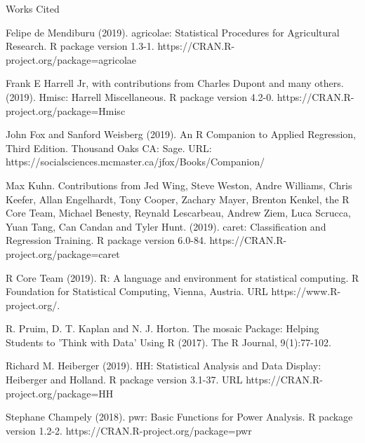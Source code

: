 \documentclass[letter,12pt]{article}
\begin{document}
	\begin{center}
		Works Cited
	\end{center}
	\raggedright
	\begin{hangparas}{.5in}{1}
		Felipe de Mendiburu (2019). agricolae: Statistical Procedures for Agricultural Research. R package version 1.3-1. https://CRAN.R-project.org/package=agricolae
	\end{hangparas}
	\begin{hangparas}{.5in}{1}
	  Frank E Harrell Jr, with contributions from Charles Dupont and many others. (2019). Hmisc: Harrell Miscellaneous. R package version 4.2-0. https://CRAN.R-project.org/package=Hmisc
	\end{hangparas}
	\begin{hangparas}{.5in}{1}
		John Fox and Sanford Weisberg (2019). An {R} Companion to Applied Regression, Third Edition. Thousand Oaks CA: Sage. URL: https://socialsciences.mcmaster.ca/jfox/Books/Companion/
	\end{hangparas}
	\begin{hangparas}{.5in}{1}
	  Max Kuhn. Contributions from Jed Wing, Steve Weston, Andre Williams, Chris Keefer, Allan Engelhardt, Tony Cooper, Zachary Mayer, Brenton Kenkel, the R Core Team, Michael Benesty, Reynald Lescarbeau, Andrew Ziem, Luca Scrucca, Yuan Tang, Can Candan and Tyler Hunt. (2019). caret: Classification and Regression Training. R package version 6.0-84. https://CRAN.R-project.org/package=caret
	\end{hangparas}
	\begin{hangparas}{.5in}{1}
		R Core Team (2019). R: A language and environment for statistical computing. R Foundation for Statistical Computing, Vienna, Austria. URL https://www.R-project.org/.
	\end{hangparas}
	\begin{hangparas}{.5in}{1}
		R. Pruim, D. T. Kaplan and N. J. Horton. The mosaic Package: Helping Students to 'Think with Data' Using R (2017). The R Journal, 9(1):77-102.
	\end{hangparas}
	\begin{hangparas}{.5in}{1}
	  Richard M. Heiberger (2019). HH: Statistical Analysis and Data Display: Heiberger and Holland. R package version 3.1-37. URL https://CRAN.R-project.org/package=HH
	\end{hangparas}
	\begin{hangparas}{.5in}{1}
		Stephane Champely (2018). pwr: Basic Functions for Power Analysis. R package version 1.2-2. https://CRAN.R-project.org/package=pwr
	\end{hangparas}
\end{document}
